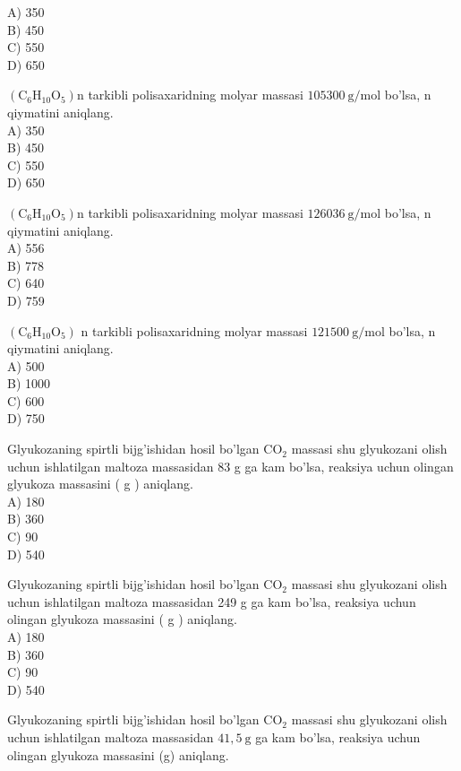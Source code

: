 A) 350\\
B) 450\\
C) 550\\
D) 650
  \item $\left(\mathrm{C}_{6} \mathrm{H}_{10} \mathrm{O}_{5}\right) \mathrm{n}$ tarkibli polisaxaridning molyar massasi $105300 \mathrm{~g} / \mathrm{mol}$ bo'lsa, n qiymatini aniqlang.\\
A) 350\\
B) 450\\
C) 550\\
D) 650
  \item $\left(\mathrm{C}_{6} \mathrm{H}_{10} \mathrm{O}_{5}\right) \mathrm{n}$ tarkibli polisaxaridning molyar massasi $126036 \mathrm{~g} / \mathrm{mol}$ bo'lsa, n qiymatini aniqlang.\\
A) 556\\
B) 778\\
C) 640\\
D) 759
  \item $\left(\mathrm{C}_{6} \mathrm{H}_{10} \mathrm{O}_{5}\right)$ n tarkibli polisaxaridning molyar massasi $121500 \mathrm{~g} / \mathrm{mol}$ bo'lsa, n qiymatini aniqlang.\\
A) 500\\
B) 1000\\
C) 600\\
D) 750
  \item Glyukozaning spirtli bijg'ishidan hosil bo'lgan $\mathrm{CO}_{2}$ massasi shu glyukozani olish uchun ishlatilgan maltoza massasidan 83 g ga kam bo'lsa, reaksiya uchun olingan glyukoza massasini ( g ) aniqlang.\\
A) 180\\
B) 360\\
C) 90\\
D) 540
  \item Glyukozaning spirtli bijg'ishidan hosil bo'lgan $\mathrm{CO}_{2}$ massasi shu glyukozani olish uchun ishlatilgan maltoza massasidan 249 g ga kam bo'lsa, reaksiya uchun olingan glyukoza massasini ( g ) aniqlang.\\
A) 180\\
B) 360\\
C) 90\\
D) 540
  \item Glyukozaning spirtli bijg'ishidan hosil bo'lgan $\mathrm{CO}_{2}$ massasi shu glyukozani olish uchun ishlatilgan maltoza massasidan $41,5 \mathrm{~g}$ ga kam bo'lsa, reaksiya uchun olingan glyukoza massasini (g) aniqlang.\\
